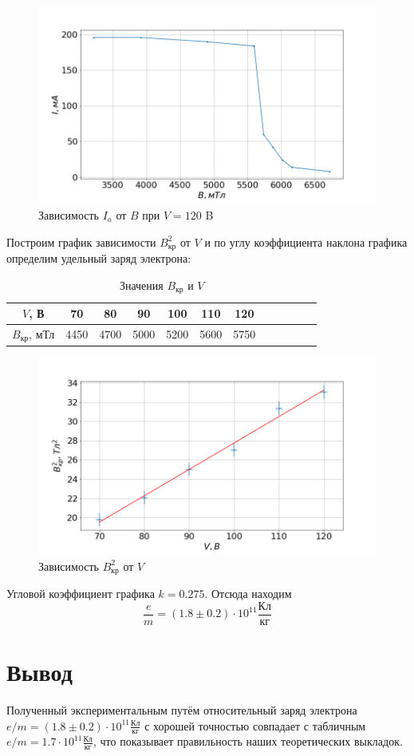 \documentclass[a4paper, fontsize=14pt]{article}
\begin{document}
\begin{figure}[H]
\center
\includegraphics[scale=0.4]{6.png}
\caption{Зависимость $I_a$ от $B$ при $V = 120$ B}
\end{figure}
\newpage
Построим график зависимости $B_\text{кр}^2$ от $V$ и по углу коэффициента наклона графика определим удельный заряд электрона:
 \begin{table}[H]
     \begin{tabular}{|c|c|c|c|c|c|c|c|c|c|c|c|}
     \hline
     $V$, В & 70 &80& 90& 100& 110& 120

\\ \hline
$B_\text{кр}$, мТл & 4450 & 4700 & 5000 & 5200 & 5600 & 5750 
\\ \hline 
\end{tabular}
	\caption{Значения $B_\text{кр}$ и $V$}
\end{table}

\begin{figure}[H]
\center
\includegraphics[scale=0.4]{gr.png}
\caption{Зависимость $B_\text{кр}^2$ от $V$}
\end{figure}
Угловой коэффициент графика $k = 0.275$. Отсюда находим
\[
 \frac{e}{m} = (1.8 \pm 0.2) \cdot 10^{11} \frac{\text{Кл}}{\text{кг}}
\]
\section*{Вывод}
Полученный экспериментальным путём относительный заряд электрона $e / m = (1.8 \pm 0.2) \cdot 10^{11} \frac{\text{Кл}}{\text{кг}}$ с хорошей точностью совпадает с табличным $e / m =  1.7 \cdot 10^{11} \frac{\text{Кл}}{\text{кг}}$, что показывает правильность наших теоретических выкладок.
\end{document}
